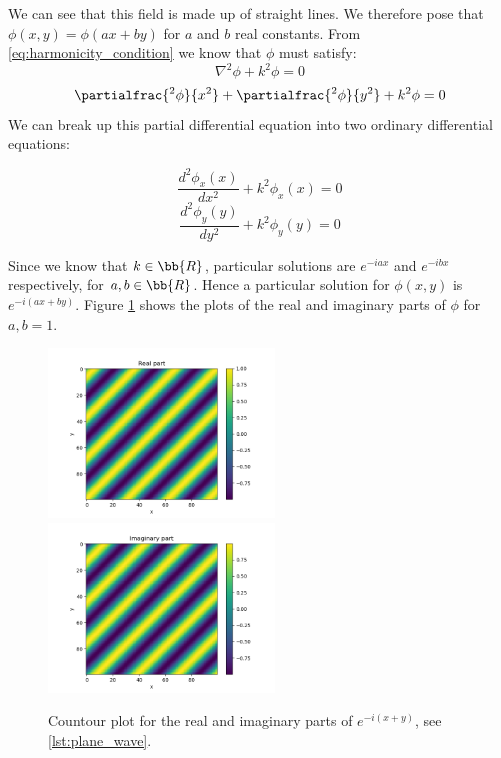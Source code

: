 We can see that this field is made up of straight lines. We therefore pose that $\phi(x,y) = \phi(ax + by)$ for $a$ and $b$ real constants. From \ref{eq:harmonicity_condition} we know that $\phi$ must satisfy:
    \begin{equation*}
        \nabla^2 \phi + k^2 \phi = 0
    \end{equation*}
    \begin{equation}
        \partialfrac{^2 \phi}{x^2} + \partialfrac{^2 \phi}{y^2} + k^2 \phi = 0
    \end{equation}
We can break up this partial differential equation into two ordinary differential equations:
    \begin{multicols}{2}
    \noindent
    \begin{equation}
        \frac{d^2 \phi_x (x)}{dx^2} + k^2 \phi_x (x) = 0
    \end{equation}
    \begin{equation}
        \frac{d^2 \phi_y (y)}{dy^2} + k^2 \phi_y (y) = 0
    \end{equation}
    \end{multicols}
Since we know that $k \in \bb{R}$, particular solutions are $e^{-iax}$ and $e^{-ibx}$ respectively, for $a,b \in \bb{R}$. Hence a particular solution for $\phi(x,y)$ is $e^{-i(ax + by)}$. Figure \ref{fig:plane_wave} shows the plots of the real and imaginary parts of $\phi$ for $a,b = 1$. 
    \begin{figure}[ht]  %
        \centering
        \includegraphics[width=6cm]{prob1/prob1_figures/py_plane_wave_real_part.png}
        \includegraphics[width=6cm]{prob1/prob1_figures/py_plane_wave_imaginary_part.png}
        \caption{Countour plot for the real and imaginary parts of $e^{-i(x+y)}$, see \ref{lst:plane_wave}.}
        \label{fig:plane_wave}
    \end{figure}

